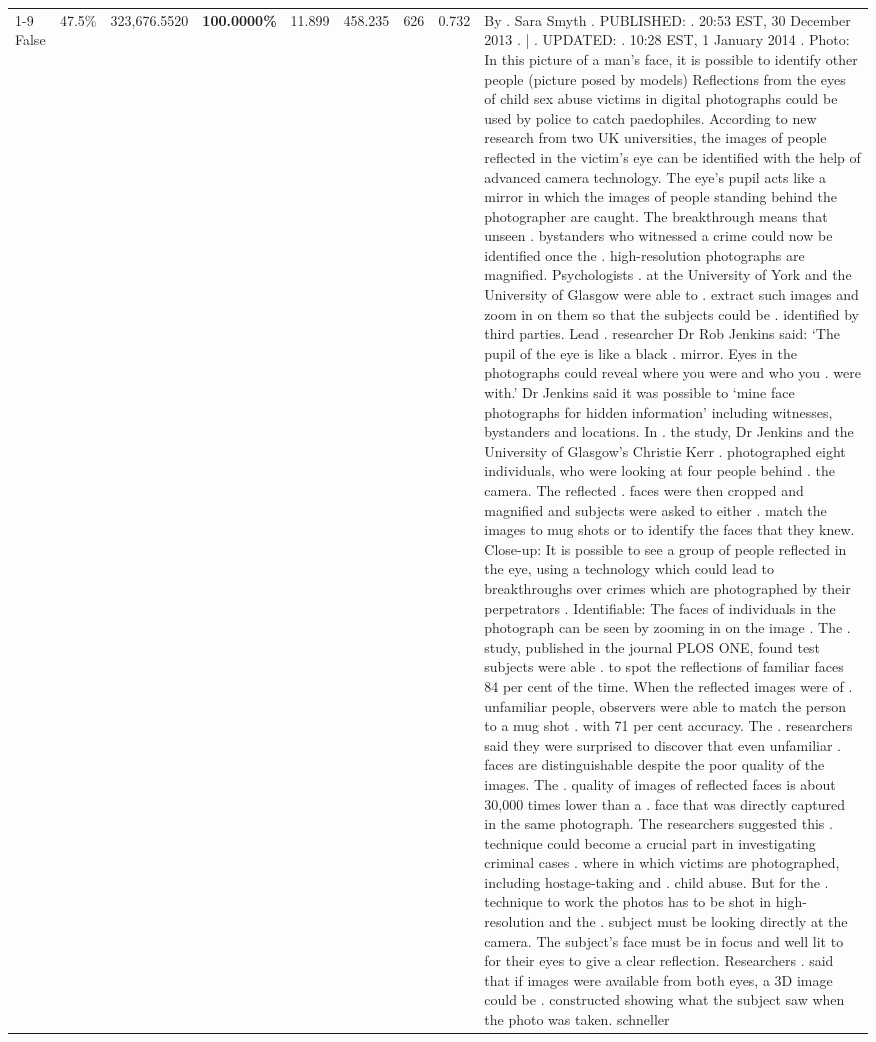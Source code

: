 \begin{table}[H]
\begin{tabular}{lllrlllll}
\cline{1-9}
False & 47.5\% & 323,676.5520 & \bfseries \color{red} 100.0000\% & 11.899 & 458.235 & 626 & 0.732 & By . Sara Smyth . PUBLISHED: . 20:53 EST, 30 December 2013 . | . UPDATED: . 10:28 EST, 1 January 2014 . Photo: In this picture of a man's face, it is possible to identify other people (picture posed by models) Reflections from the eyes of child sex abuse victims in digital photographs could be used by police to catch paedophiles. According to new research from two UK universities, the images of people reflected in the victim's eye can be identified with the help of advanced camera technology. The eye's pupil acts like a mirror in which the images of people standing behind the photographer are caught. The breakthrough means that unseen . bystanders who witnessed a crime could now be identified once the . high-resolution photographs are magnified. Psychologists . at the University of York and the University of Glasgow were able to . extract such images and zoom in on them so that the subjects could be . identified by third parties. Lead . researcher Dr Rob Jenkins said: ‘The pupil of the eye is like a black . mirror. Eyes in the photographs could reveal where you were and who you . were with.' Dr Jenkins said it was possible to ‘mine face photographs for hidden information' including witnesses, bystanders and locations. In . the study, Dr Jenkins and the University of Glasgow's Christie Kerr . photographed eight individuals, who were looking at four people behind . the camera. The reflected . faces were then cropped and magnified and subjects were asked to either . match the images to mug shots or to identify the faces that they knew. Close-up: It is possible to see a group of people reflected in the eye, using a technology which could lead to breakthroughs over crimes which are photographed by their perpetrators . Identifiable: The faces of individuals in the photograph can be seen by zooming in on the image . The . study, published in the journal PLOS ONE, found test subjects were able . to spot the reflections of familiar faces 84 per cent of the time. When the reflected images were of . unfamiliar people, observers were able to match the person to a mug shot . with 71 per cent accuracy. The . researchers said they were surprised to discover that even unfamiliar . faces are distinguishable despite the poor quality of the images. The . quality of images of reflected faces is about 30,000 times lower than a . face that was directly captured in the same photograph. The researchers suggested this . technique could become a crucial part in investigating criminal cases . where in which victims are photographed, including hostage-taking and . child abuse. But for the . technique to work the photos has to be shot in high-resolution and the . subject must be looking directly at the camera. The subject's face must be in focus and well lit to for their eyes to give a clear reflection. Researchers . said that if images were available from both eyes, a 3D image could be . constructed showing what the subject saw when the photo was taken. schneller \\

\end{tabular}
\end{table}
